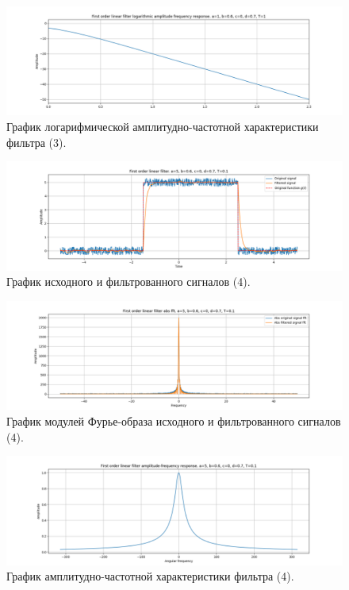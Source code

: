 \documentclass[a4paper, 12pt]{article}
\begin{document}
    \begin{figure}[H]
        \centering
        \includegraphics[scale=0.4]{3_lafr_filtered_linear.png}
        \captionsetup{skip=0pt}
        \caption{График логарифмической амплитудно-частотной характеристики фильтра (3).}
        \label{fig:filinlafr13}
    \end{figure}
    \begin{figure}[H]
        \centering
        \includegraphics[scale=0.4]{4_filtered_linear.png}
        \captionsetup{skip=0pt}
        \caption{График исходного и фильтрованного сигналов (4).}
        \label{fig:filin14}
    \end{figure}
    \begin{figure}[H]
        \centering
        \includegraphics[scale=0.4]{4_abs_filtered_linear.png}
        \captionsetup{skip=0pt}
        \caption{График модулей Фурье-образа исходного и фильтрованного сигналов (4).}
        \label{fig:filinabs14}
    \end{figure}
    \begin{figure}[H]
        \centering
        \includegraphics[scale=0.4]{4_afr_filtered_linear.png}
        \captionsetup{skip=0pt}
        \caption{График амплитудно-частотной характеристики фильтра (4).}
        \label{fig:filinafr14}
    \end{figure}
\end{document}
